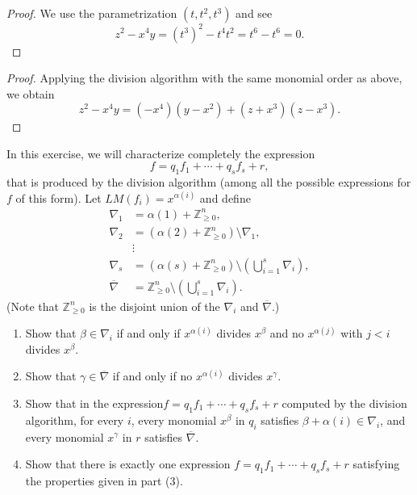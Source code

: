 \begin{proof}
    We use the parametrization $(t, t^2, t^3)$ and see 
    \[z^2 - x^4 y = (t^3)^2 - t^4 t^2 = t^6 - t^6 = 0.\]
\end{proof}

\begin{proof}
    Applying the division algorithm with the same monomial order as above, we obtain
    \[
    z^2 - x^4 y
    =
    (-x^4)(y - x^2)
    +
    (z + x^3)(z - x^3).
    \]
\end{proof}


\begin{tcolorbox}[title=Problem 11, breakable]
    In this exercise, we will characterize completely the expression 
    \[f = q_1 f_1 + \cdots + q_s f_s + r,\]
    that is produced by the division algorithm (among all the possible 
    expressions for $f$ of this form). Let $LM(f_i) = x^{\alpha(i)}$ and define 
    \begin{align*}
        \nabla_1 &= \alpha(1) + \mathbb{Z}_{\ge 0}^n, \\
        \nabla_2 &= (\alpha(2) + \mathbb{Z}_{\ge 0}^n) \setminus \nabla_1, \\
        &\vdots \\
        \nabla_s &= (\alpha(s) + \mathbb{Z}_{\ge 0}^n) \setminus \left(\bigcup_{i = 1}^s \nabla_i\right), \\
        \overline{\nabla} &= \mathbb{Z}_{\ge 0}^n \setminus \left(\bigcup_{i = 1}^s \nabla_i\right).
    \end{align*}
    (Note that $\mathbb{Z}_{\ge 0}^n$ is the disjoint union of the $\nabla_i$ and $\overline{\nabla}$.)
    \begin{enumerate}
        \item Show that $\beta \in \nabla_i$ if and only if $x^{\alpha(i)}$ divides $x^\beta$ and no $x^{\alpha(j)}$ with $j < i$ divides $x^\beta$.
        \item Show that $\gamma \in \overline{\nabla}$ if and only if no $x^{\alpha(i)}$ divides $x^\gamma$.
        \item Show that in the expression$f = q_1 f_1 + \cdots + q_s f_s + r$ computed by the division algorithm,
        for every $i$, every monomial $x^\beta$ in $q_i$ satisfies $\beta + \alpha(i) \in \nabla_i$, and every 
        monomial $x^\gamma$ in $r$ satisfies $\overline{\nabla}$.
        \item Show that there is exactly one expression $f = q_1 f_1 + \cdots + q_s f_s + r$ satisfying
        the properties given in part (3).
    \end{enumerate}
\end{tcolorbox}

